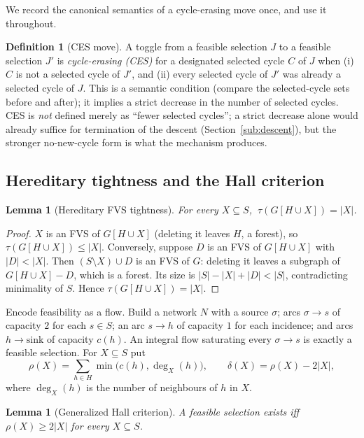 \documentclass[11pt]{article}
\theoremstyle{plain}
\newtheorem{lemma}[theorem]{Lemma}
\theoremstyle{definition}
\newtheorem{definition}[theorem]{Definition}
\newcommand{\FVS}{\tau}
\begin{document}
We record the canonical semantics of a cycle-erasing move once, and use it
throughout.

\begin{definition}[CES move]\label{def:CES}
A toggle from a feasible selection $J$ to a feasible selection $J'$ is
\emph{cycle-erasing (CES)} for a designated selected cycle $C$ of $J$ when
(i) $C$ is not a selected cycle of $J'$, and (ii) every selected cycle of $J'$
was already a selected cycle of $J$. This is a semantic condition (compare the
selected-cycle sets before and after); it implies a strict decrease in the number
of selected cycles. CES is \emph{not} defined merely as ``fewer selected
cycles''; a strict decrease alone would already suffice for termination of the
descent (Section~\ref{sub:descent}), but the stronger no-new-cycle form is what
the mechanism produces.
\end{definition}

\subsection{Hereditary tightness and the Hall criterion}\label{sub:hall}

\begin{lemma}[Hereditary FVS tightness]\label{lem:C2}
For every $X\subseteq S$, $\ \FVS\!\left(G[H\cup X]\right)=|X|$.
\end{lemma}

\begin{proof}
$X$ is an FVS of $G[H\cup X]$ (deleting it leaves $H$, a forest), so
$\FVS(G[H\cup X])\le|X|$. Conversely, suppose $D$ is an FVS of $G[H\cup X]$ with
$|D|<|X|$. Then $(S\setminus X)\cup D$ is an FVS of $G$: deleting it leaves a
subgraph of $G[H\cup X]-D$, which is a forest. Its size is
$|S|-|X|+|D|<|S|$, contradicting minimality of $S$. Hence
$\FVS(G[H\cup X])=|X|$.
\end{proof}

Encode feasibility as a flow. Build a network $N$ with a source $\sigma$; arcs
$\sigma\to s$ of capacity $2$ for each $s\in S$; an arc $s\to h$ of capacity $1$
for each incidence; and arcs $h\to\text{sink}$ of capacity $c(h)$. An integral
flow saturating every $\sigma\to s$ is exactly a feasible selection. For
$X\subseteq S$ put
\[
\rho(X)=\sum_{h\in H}\min\bigl(c(h),\deg_X(h)\bigr),\qquad
\delta(X)=\rho(X)-2|X|,
\]
where $\deg_X(h)$ is the number of neighbours of $h$ in $X$.

\begin{lemma}[Generalized Hall criterion]\label{lem:C5}
A feasible selection exists iff $\rho(X)\ge2|X|$ for every $X\subseteq S$.
\end{lemma}
\end{document}
